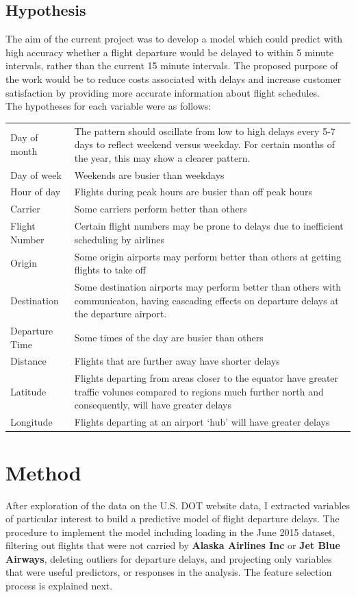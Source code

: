 \documentclass[a4paper, 10pt]{article}
\begin{document}
\subsection{Hypothesis}\label{hypothesis}
The aim of the current project was to develop a model which could predict with high accuracy whether a flight departure would be delayed to within 5 minute intervals, rather than the current 15 minute intervals. The proposed purpose of the work would be to reduce costs associated with delays and increase customer satisfaction by providing more accurate information about flight schedules. \\
The hypotheses for each variable were as follows:\\

\begin{tabular}{l p{11cm}  }
Day of month & The pattern should oscillate from low to high delays every 5-7 days to reflect weekend versus weekday. For certain months of the year, this may show a clearer pattern.\\
Day of week & Weekends are busier than weekdays\\
Hour of day & Flights during peak hours are busier than off peak hours\\
Carrier & Some carriers perform better than others\\
Flight Number & Certain flight numbers may be prone to delays due to inefficient scheduling by airlines\\
Origin & Some origin airports may perform better than others at getting flights to take off\\
Destination & Some destination airports may perform better than others with communicaton, having cascading effects on departure delays at the departure airport. \\
Departure Time & Some times of the day are busier than others\\
Distance & Flights that are further away have shorter delays\\
Latitude & Flights departing from areas closer to the equator have greater traffic volunes compared to regions much further north and consequently, will have greater delays\\
Longitude & Flights departing at an airport `hub' will have greater delays
\end{tabular}



\section{Method}
After exploration of the data on the U.S. DOT website data, I extracted variables of particular interest to build a predictive model of flight departure delays. The procedure to implement the model including loading in the June 2015 dataset, filtering out flights that were not carried by \textbf{Alaska Airlines Inc} or \textbf{Jet Blue Airways}, deleting outliers for departure delays, and projecting only variables that were useful predictors, or responses in the analysis. The feature selection process is explained next.
\end{document}
